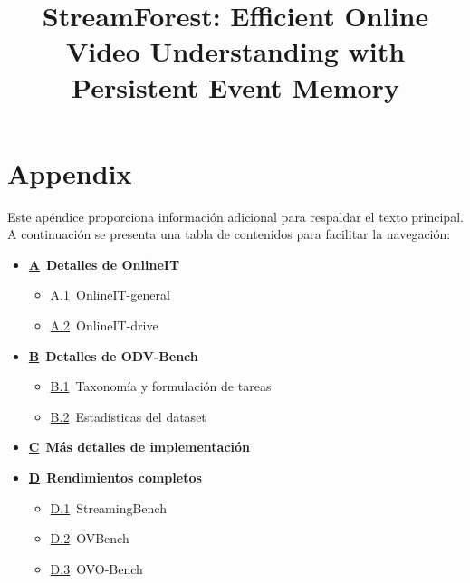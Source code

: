 \documentclass{article}
\title{StreamForest: Efficient Online Video Understanding with Persistent Event Memory}
\begin{document}
\appendix
\renewcommand{\thesection}{\Alph{section}}
\renewcommand{\thesubsection}{\Alph{section}.\arabic{subsection}}

\section*{Appendix}

Este apéndice proporciona información adicional para respaldar el texto principal. A continuación se presenta una tabla de contenidos para facilitar la navegación:

\begin{itemize}
    \item \hyperref[app:sec:Details_of_OnlineIT]{\textbf{A}}~\textbf{Detalles de OnlineIT}
    \begin{itemize}
        \item \hyperref[app:sec:Details_of_OnlineIT:OnlineIT-general]{A.1}~OnlineIT-general
        \item \hyperref[app:sec:Details_of_OnlineIT:OnlineIT-drive]{A.2}~OnlineIT-drive
    \end{itemize}

    \item \hyperref[app:sec:Details_of_ODVBench]{\textbf{B}}~\textbf{Detalles de ODV-Bench}
    \begin{itemize}
        \item \hyperref[app:sec:Details_of_ODVBench:Task]{B.1}~Taxonomía y formulación de tareas
        \item \hyperref[app:sec:Details_of_ODVBench:Statistics]{B.2}~Estadísticas del dataset
    \end{itemize}

    \item \hyperref[app:sec:More_Implementation_Details]{\textbf{C}}~\textbf{Más detalles de implementación}

    \item \hyperref[app:sec:Full_Performances]{\textbf{D}}~\textbf{Rendimientos completos}
    \begin{itemize}
        \item \hyperref[app:sec:Full_Performances:StreamingBench]{D.1}~StreamingBench
        \item \hyperref[app:sec:Full_Performances:OVBench]{D.2}~OVBench
        \item \hyperref[app:sec:Full_Performances:OVO-Bench]{D.3}~OVO-Bench
    \end{itemize}


\end{itemize}
\end{document}
